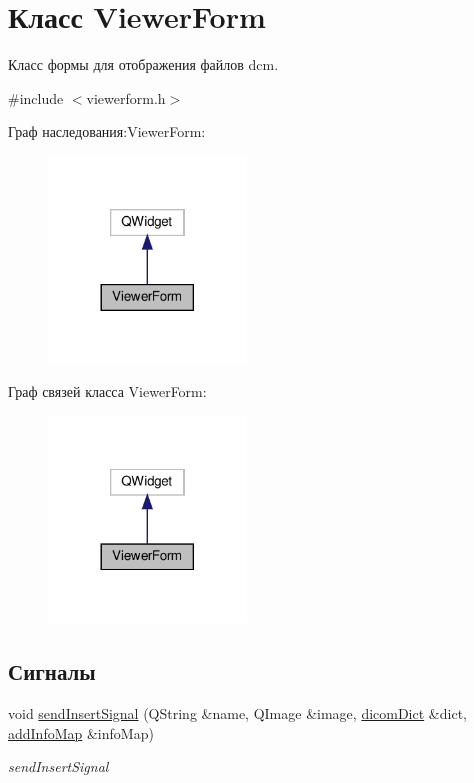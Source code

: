 \hypertarget{classViewerForm}{}\section{Класс Viewer\+Form}
\label{classViewerForm}


Класс формы для отображения файлов dcm.  




{\ttfamily \#include $<$viewerform.\+h$>$}



Граф наследования\+:Viewer\+Form\+:\nopagebreak
\begin{figure}[H]
\begin{center}
\leavevmode
\includegraphics[width=149pt]{classViewerForm__inherit__graph}
\end{center}
\end{figure}


Граф связей класса Viewer\+Form\+:\nopagebreak
\begin{figure}[H]
\begin{center}
\leavevmode
\includegraphics[width=149pt]{classViewerForm__coll__graph}
\end{center}
\end{figure}
\subsection*{Сигналы}
\begin{DoxyCompactItemize}
\item 
void \hyperlink{classViewerForm_a5d3adb46be46748d665e38e47decdf2c}{send\+Insert\+Signal} (Q\+String \&name, Q\+Image \&image, \hyperlink{tagshelpers_8h_ae25d30658f61420b88a380dc9e40bb74}{dicom\+Dict} \&dict, \hyperlink{dbform_8h_a1ec1a645f41e1c6544d384ca863a936c}{add\+Info\+Map} \&info\+Map)
\begin{DoxyCompactList}\small\item\em send\+Insert\+Signal \end{DoxyCompactList}\end{DoxyCompactItemize}
